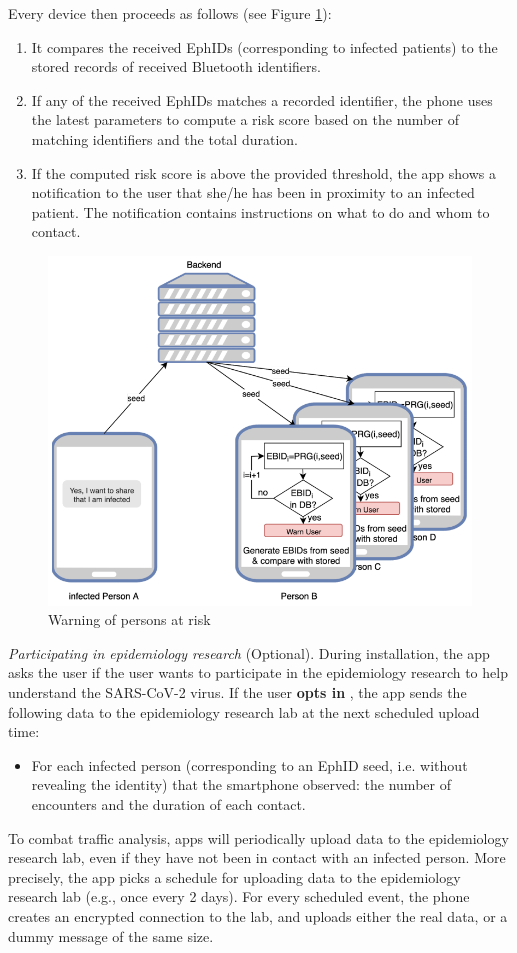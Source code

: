 \documentclass[12pt,a4paper]{article}
\begin{document}
Every device then proceeds as follows (see Figure \ref{risk}):
\begin{enumerate}\itemsep0pt
\item It compares the received EphIDs (corresponding to infected patients) to the stored
records of received Bluetooth identifiers.
\item If any of the received EphIDs matches a recorded identifier, the phone uses the latest parameters to compute a risk score based on the number of matching identifiers and
the total duration.
\item If the computed risk score is above the provided threshold, the app shows a
notification to the user that she/he has been in proximity to an infected patient. The
notification contains instructions on what to do and whom to contact.
\end{enumerate}
\begin{figure}
\centering
\includegraphics[scale=0.6]{fig/risk}
\caption{Warning of persons at risk}
\label{risk}
\end{figure}
\textit{Participating in epidemiology research} (Optional). During installation, the app asks the user if the user wants to participate in the epidemiology research to help understand the SARS-CoV-2 virus. If the user \textbf{opts in} , the app sends the following data to the epidemiology research lab at the next scheduled upload time:
\begin{itemize}\itemsep0pt
\item For each infected person (corresponding to an EphID seed, i.e. without revealing the
identity) that the smartphone observed: the number of encounters and the duration of
each contact.
\end{itemize}
To combat traffic analysis, apps will periodically upload data to the epidemiology research lab, even if they have not been in contact with an infected person. More precisely, the app picks a schedule for uploading data to the epidemiology research lab (e.g., once every 2 days). For every scheduled event, the phone creates an encrypted connection to the lab, and uploads either the real data, or a dummy message of the same size.
\end{document}
